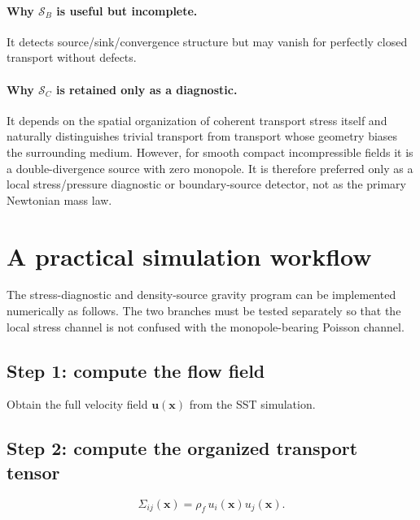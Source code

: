 \documentclass[11pt]{article}
\newcommand{\rhoF}{\rho_{\!f}}
\begin{document}
        \paragraph{Why \(\mathcal{S}_B\) is useful but incomplete.}
            It detects source/sink/convergence structure but may vanish for perfectly closed transport without defects.
        
        \paragraph{Why \(\mathcal{S}_C\) is retained only as a diagnostic.}
            It depends on the spatial organization of coherent transport stress itself and naturally distinguishes trivial transport from transport whose geometry biases the surrounding medium.  However, for smooth compact incompressible fields it is a double-divergence source with zero monopole.  It is therefore preferred only as a local stress/pressure diagnostic or boundary-source detector, not as the primary Newtonian mass law.
        
        \section{A practical simulation workflow}
        
        The stress-diagnostic and density-source gravity program can be implemented numerically as follows.  The two branches must be tested separately so that the local stress channel is not confused with the monopole-bearing Poisson channel.
        
        \subsection*{Step 1: compute the flow field}
            Obtain the full velocity field \(\mathbf{u}(\mathbf{x})\) from the SST simulation.
        
        \subsection*{Step 2: compute the organized transport tensor}
            \begin{equation}
                \Sigma_{ij}(\mathbf{x}) = \rhoF\,u_i(\mathbf{x})u_j(\mathbf{x}).
                \label{eq:workflow-Sigma}
            \end{equation}
        
\end{document}
